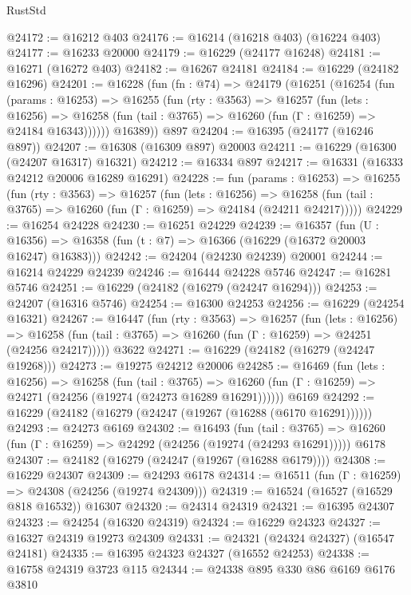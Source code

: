 \begin{lexlean}{RustStd}
\begin{coremodule}
@24172 := @16212 @403
@24176 := @16214 (@16218 @403) (@16224 @403)
@24177 := @16233 @20000
@24179 := @16229 (@24177 @16248)
@24181 := @16271 (@16272 @403)
@24182 := @16267 @24181
@24184 := @16229 (@24182 @16296)
@24201 := @16228
    (fun (fn : @74) =>
    @24179
      (@16251
        (@16254
          (fun (params : @16253) =>
          @16255
            (fun (rty : @3563) =>
            @16257
              (fun (lets : @16256) =>
              @16258 (fun (tail : @3765) => @16260 (fun (Γ : @16259) => @24184 @16343))))))
        @16389))
    @897
@24204 := @16395 (@24177 (@16246 @897))
@24207 := @16308 (@16309 @897) @20003
@24211 := @16229 (@16300 (@24207 @16317) @16321)
@24212 := @16334 @897
@24217 := @16331 (@16333 @24212 @20006 @16289 @16291)
@24228 := fun (params : @16253) =>
  @16255
    (fun (rty : @3563) =>
    @16257
      (fun (lets : @16256) =>
      @16258 (fun (tail : @3765) => @16260 (fun (Γ : @16259) => @24184 (@24211 @24217)))))
@24229 := @16254 @24228
@24230 := @16251 @24229
@24239 := @16357
    (fun (U : @16356) => @16358 (fun (t : @7) => @16366 (@16229 (@16372 @20003 @16247) @16383)))
@24242 := @24204 (@24230 @24239) @20001
@24244 := @16214 @24229 @24239
@24246 := @16444 @24228 @5746
@24247 := @16281 @5746
@24251 := @16229 (@24182 (@16279 (@24247 @16294)))
@24253 := @24207 (@16316 @5746)
@24254 := @16300 @24253
@24256 := @16229 (@24254 @16321)
@24267 := @16447
    (fun (rty : @3563) =>
    @16257
      (fun (lets : @16256) =>
      @16258 (fun (tail : @3765) => @16260 (fun (Γ : @16259) => @24251 (@24256 @24217)))))
    @3622
@24271 := @16229 (@24182 (@16279 (@24247 @19268)))
@24273 := @19275 @24212 @20006
@24285 := @16469
    (fun (lets : @16256) =>
    @16258
      (fun (tail : @3765) =>
      @16260 (fun (Γ : @16259) => @24271 (@24256 (@19274 (@24273 @16289 @16291))))))
    @6169
@24292 := @16229 (@24182 (@16279 (@24247 (@19267 (@16288 (@6170 @16291))))))
@24293 := @24273 @6169
@24302 := @16493
    (fun (tail : @3765) => @16260 (fun (Γ : @16259) => @24292 (@24256 (@19274 (@24293 @16291)))))
    @6178
@24307 := @24182 (@16279 (@24247 (@19267 (@16288 @6179))))
@24308 := @16229 @24307
@24309 := @24293 @6178
@24314 := @16511 (fun (Γ : @16259) => @24308 (@24256 (@19274 @24309)))
@24319 := @16524 (@16527 (@16529 @818 @16532)) @16307
@24320 := @24314 @24319
@24321 := @16395 @24307
@24323 := @24254 (@16320 @24319)
@24324 := @16229 @24323
@24327 := @16327 @24319 @19273 @24309
@24331 := @24321 (@24324 @24327) (@16547 @24181)
@24335 := @16395 @24323 @24327 (@16552 @24253)
@24338 := @16758 @24319 @3723 @115
@24344 := @24338 @895 @330 @86 @6169 @6176 @3810

\end{coremodule}
\end{lexlean}
